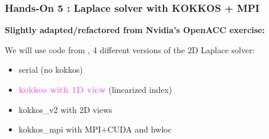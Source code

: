 \begin{frame}
  \frametitle{Hands-On 5 : Laplace solver with KOKKOS + MPI}

  \textbf{Slightly adapted/refactored from Nvidia's OpenACC exercise:}\\

  We will use code from , 4 different versions of the 2D Laplace solver:
  \begin{itemize}
  \item serial (no kokkos)
  \item \textcolor{violet}{\textbf{kokkos with 1D view}} (linearized index)
  \item kokkos\_v2 with 2D views
  \item kokkos\_mpi with MPI+CUDA and hwloc
  \end{itemize}
  
\end{frame}
